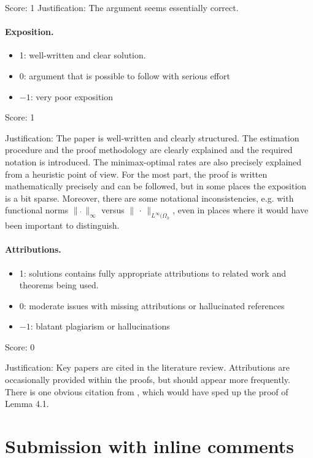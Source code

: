 \documentclass[11pt]{article}
\numberwithin{equation}{section}
\begin{document}
\noindent Score: 1
\noindent Justification: The argument seems essentially correct.

\paragraph{Exposition.}
\begin{itemize}
	\item  1: well-written and clear solution.
	\item  0: argument that is possible to follow with serious effort
	\item  $-1$: very poor exposition
\end{itemize}

\noindent Score: 1

\noindent Justification: The paper is well-written and clearly structured. The estimation procedure and the proof methodology are clearly explained and the required notation is introduced. The minimax-optimal rates are also precisely explained from a heuristic point of view. For the most part, the proof is written mathematically precisely and can be followed, but in some places the exposition is a bit sparse. Moreover, there are some notational inconsistencies, e.g. with functional norms $\|\,\dot\, \|_\infty$ versus $\|\,\cdot\, \|_{L^\infty(\Omega_h}$, even in places where it would have been important to distinguish.

\paragraph{Attributions.}
\begin{itemize}
	\item  1: solutions contains fully appropriate attributions
		to related work and theorems being used.
	\item  0: moderate issues with missing attributions or hallucinated references
	\item  $-1$: blatant plagiarism or hallucinations
\end{itemize}

\noindent Score: 0

\noindent Justification: Key papers are cited in the literature review. Attributions are occasionally provided within the proofs, but should appear more frequently. There is one obvious citation from \cite{NvdGW}, which would have sped up the proof of Lemma 4.1.

\newpage
\section{Submission with inline comments}
\end{document}
